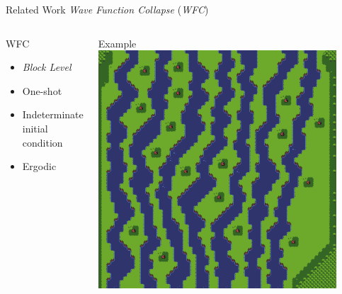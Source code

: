 \documentclass{beamer}
\begin{document}
  \begin{frame}[fragile]{Related Work}
    \textit{Wave Function Collapse} (\textit{WFC})
    \begin{columns}[T,onlytextwidth]
        \begin{block}{WFC}
          \hfill \\
          \begin{itemize}
            \item \textit{Block Level}
            \item One-shot
            \item Indeterminate initial condition
            \item Ergodic
          \end{itemize}
        \end{block}
        \begin{block}{Example}
          \includegraphics[width=0.9\textwidth]{img/forestmicro_64x64.pdf}
        \end{block}
    \end{columns}
  \end{frame}

\end{document}
